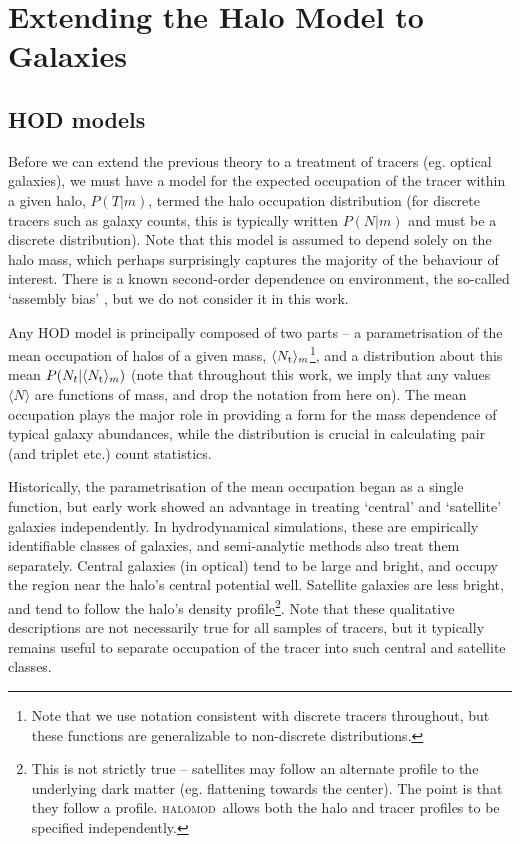 \documentclass[5p,aas_macros]{elsarticle}
\newcommand{\Nt}{\langle N_{\rm t} \rangle} %
\newcommand{\halomod}{\textsc{halomod}\xspace} %
\providecommand{\DIFaddtex}[1]{{\protect\color{blue}\uwave{#1}}} %
\providecommand{\DIFdeltex}[1]{{\protect\color{red}\sout{#1}}}                      %
\providecommand{\DIFaddbegin}{} %
\providecommand{\DIFaddend}{} %
\providecommand{\DIFdelbegin}{} %
\providecommand{\DIFdelend}{} %
\providecommand{\DIFadd}[1]{\texorpdfstring{\DIFaddtex{#1}}{#1}} %
\providecommand{\DIFdel}[1]{\texorpdfstring{\DIFdeltex{#1}}{}} %
\begin{document}
\section{Extending the Halo Model to Galaxies}
\label{sec:TracerHaloModel}

\subsection{HOD models}
\label{sec:theory-gal:hod}
Before we can extend the previous theory to a treatment of tracers (eg. optical galaxies), we must have a model for the expected occupation of the tracer within a given halo, $P(T|m)$, termed the halo occupation distribution (for discrete tracers such as galaxy counts, this is typically written $P(N|m)$ and must be a discrete distribution). Note that this model is assumed to depend solely on the halo mass, which perhaps surprisingly captures the majority of the behaviour of interest. There is a known second-order dependence on environment, the so-called `assembly bias' \citep{Sunayama2015}, but we do not consider it in this work.

Any HOD model is principally composed of two parts -- a parametrisation of the mean occupation of halos of a given mass, $\Nt_m$\footnote{Note that we use notation consistent with discrete tracers throughout, but these functions are generalizable to non-discrete distributions.}, and a distribution about this mean \DIFdelbegin \DIFdel{$P(N_t|\Nt_m)$ }\DIFdelend \DIFaddbegin \DIFadd{$P(N_{\rm t}|\Nt_m)$ }\DIFaddend (note that throughout this work, we imply that any values $\langle N \rangle$ are functions of mass, and drop the notation from here on). The mean occupation plays the major role in providing a form for the mass dependence of typical galaxy abundances, while the distribution is crucial in calculating pair (and triplet etc.) count statistics. 

Historically, the parametrisation of the mean occupation began as a single function, but early work \citep{Kauffmann2004,Zheng2005,Zehavi2005} showed an advantage in treating `central' and `satellite' galaxies independently. In hydrodynamical simulations, these are empirically identifiable classes of galaxies, and semi-analytic methods also treat them separately. Central galaxies (in optical) tend to be large and bright, and occupy the region near the halo's central potential well. Satellite galaxies are less bright, and tend to follow the halo's density profile\footnote{This is not strictly true -- satellites may follow an alternate profile to the underlying dark matter (eg. flattening towards the center). The point is that they follow a profile. \halomod\ allows both the halo and tracer profiles to be specified independently.}.  Note that these qualitative descriptions are not necessarily true for all samples of tracers, but it typically remains useful to separate occupation of the tracer into such central and satellite classes.
\end{document}
